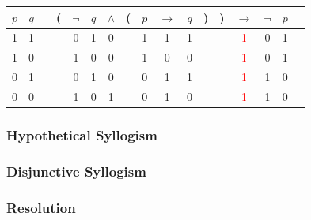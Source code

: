 \documentclass[english,course]{Notes}
\begin{document}
\begin{minipage}{.5\textwidth}
\end{minipage}
\begin{minipage}{.5\textwidth}
\centering
\begin{tabular}{@{ }c@{ }@{ }c | c@{ }@{}c@{}@{ }c@{ }@{ }c@{ }@{ }c@{ }@{}c@{}@{ }c@{ }@{ }c@{ }@{ }c@{ }@{}c@{}@{}c@{}@{ }c@{ }@{ }c@{ }@{ }c@{ }@{ }c}
$p$ & $q$ &  & ( & $\lnot$ & $q$ & $\land$ & ( & $p$ & $\rightarrow$ & $q$ & ) & ) & $\rightarrow$ & $\lnot$ & $p$ & \\
\hline 
1 & 1 &  &  & 0 & 1 & 0 &  & 1 & 1 & 1 &  &  & \textcolor{red}{1} & 0 & 1 & \\
1 & 0 &  &  & 1 & 0 & 0 &  & 1 & 0 & 0 &  &  & \textcolor{red}{1} & 0 & 1 & \\
0 & 1 &  &  & 0 & 1 & 0 &  & 0 & 1 & 1 &  &  & \textcolor{red}{1} & 1 & 0 & \\
0 & 0 &  &  & 1 & 0 & 1 &  & 0 & 1 & 0 &  &  & \textcolor{red}{1} & 1 & 0 & \\
\end{tabular}
\end{minipage}


\subsubsection{Hypothetical Syllogism}

\begin{minipage}{.5\textwidth}
\end{minipage}

\subsubsection{Disjunctive Syllogism}

\begin{minipage}{.5\textwidth}
\end{minipage}

\subsubsection{Resolution}

\begin{minipage}{.5\textwidth}
\end{minipage}
\end{document}
